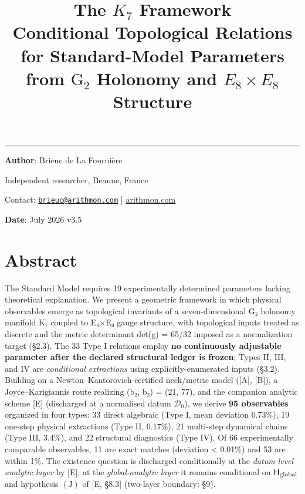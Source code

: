 \documentclass[11pt,a4paper]{article}
\title{%
\LARGE\textbf{The $K_7$ Framework}\\[0.3em]
\large Conditional Topological Relations for Standard-Model Parameters\\
from $\mathrm{G}_2$ Holonomy and $E_8 \times E_8$ Structure%
}
\author{}
\date{}
\begin{document}
\maketitle
\noindent\rule{\textwidth}{0.2pt}

\noindent\textbf{Author}: Brieuc de La Fourni\`ere

\noindent Independent researcher, Beaune, France

\noindent Contact: \href{mailto:brieuc@arithmon.com}{\texttt{brieuc@arithmon.com}} \quad | \quad \href{https://arithmon.com}{arithmon.com}

\noindent\textbf{Date}: July 2026 \quad v3.5

\enlargethispage{2\baselineskip}

\section{Abstract}\label{abstract}

The Standard Model requires 19 experimentally determined parameters lacking theoretical explanation. We present a geometric framework in which physical observables emerge as topological invariants of a seven-dimensional G₂ holonomy manifold K₇ coupled to E₈×E₈ gauge structure, with topological inputs treated as discrete and the metric determinant det(g) = 65/32 imposed as a normalization target (§2.3). The 33 Type I relations employ \textbf{no continuously adjustable parameter after the declared structural ledger is frozen}; Types II, III, and IV are \emph{conditional extractions} using explicitly-enumerated inputs (§3.2). Building on a Newton--Kantorovich-certified neck/metric model ({[}A{]}, {[}B{]}), a Joyce--Karigiannis route realizing (b₂, b₃) = (21, 77), and the companion analytic scheme {[}E{]} (discharged at a normalised datum \(\mathcal D_0\)), we derive \textbf{95 observables} organized in four types: 33 direct algebraic (Type I, mean deviation 0.73\%), 19 one-step physical extractions (Type II, 0.17\%), 21 multi-step dynamical chains (Type III, 3.4\%), and 22 structural diagnostics (Type IV). Of 66 experimentally comparable observables, 11 are exact matches (deviation \textless{} 0.01\%) and 53 are within 1\%. The existence question is discharged conditionally at the \emph{datum-level analytic layer} by {[}E{]}; at the \emph{global-analytic layer} it remains conditional on \(\mathsf H_{\rm global}\) and hypothesis \((\mathrm J)\) of {[}E, §8.3{]} (two-layer boundary: §9).
\end{document}
